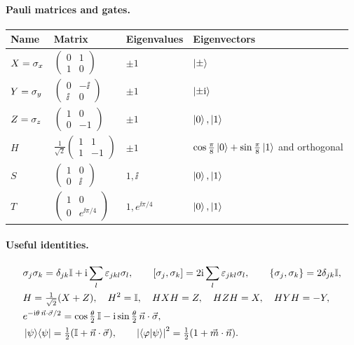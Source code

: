 \paragraph{Pauli matrices and gates.}
\begin{center}
\small
\begin{tabular}{@{}llll@{}}
  \toprule
  Name & Matrix & Eigenvalues & Eigenvectors\\
  \midrule
  $X=\sigma_x$ & $\begin{pmatrix}0&1\\1&0\end{pmatrix}$ & $\pm1$ & $\left|\pm\right\rangle$\\[6pt]
  $Y=\sigma_y$ & $\begin{pmatrix}0&-\ii\\\ii&0\end{pmatrix}$ & $\pm1$ & $\left|\pm\mathrm{i}\right\rangle$\\[6pt]
  $Z=\sigma_z$ & $\begin{pmatrix}1&0\\0&-1\end{pmatrix}$ & $\pm1$ & $\left|0\right\rangle,\left|1\right\rangle$\\[6pt]
  $H$ & $\frac1{\sqrt2}\begin{pmatrix}1&1\\1&-1\end{pmatrix}$ & $\pm1$ & $\cos\frac\pi8\left|0\right\rangle+\sin\frac\pi8\left|1\right\rangle$ and orthogonal\\[6pt]
  $S$ & $\begin{pmatrix}1&0\\0&\ii\end{pmatrix}$ & $1,\ii$ & $\left|0\right\rangle,\left|1\right\rangle$\\[6pt]
  $T$ & $\begin{pmatrix}1&0\\0&e^{\ii\pi/4}\end{pmatrix}$ & $1,e^{\ii\pi/4}$ & $\left|0\right\rangle,\left|1\right\rangle$\\
  \bottomrule
\end{tabular}
\end{center}

\paragraph{Useful identities.}
\begin{align*}
  &\sigma_j\sigma_k=\delta_{jk}\mathbb{I}+\mathrm{i}\sum_l\varepsilon_{jkl}\sigma_l,\qquad
  [\sigma_j,\sigma_k]=2\mathrm{i}\sum_l\varepsilon_{jkl}\sigma_l,\qquad\{\sigma_j,\sigma_k\}=2\delta_{jk}\mathbb{I},\\
  &H=\tfrac{1}{\sqrt2}(X+Z),\quad H^2=\mathbb{I},\quad HXH=Z,\quad HZH=X,\quad HYH=-Y,\\
  &e^{-\mathrm{i}\theta\,\vec n\cdot\vec\sigma/2}=\cos\tfrac\theta2\,\mathbb{I}-\mathrm{i}\sin\tfrac\theta2\,\vec n\cdot\vec\sigma,\\
  &\left|\psi\right\rangle\!\left\langle\psi\right|=\tfrac12(\mathbb{I}+\vec n\cdot\vec\sigma),\qquad \left|\left\langle\varphi\middle|\psi\right\rangle\right|^2=\tfrac12(1+\vec m\cdot\vec n).
\end{align*}

